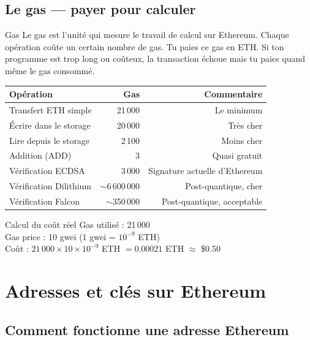 \documentclass[12pt, a4paper]{article}
\begin{document}
\subsection{Le gas --- payer pour calculer}

\begin{definition}{Gas}
Le gas est l'unité qui mesure le travail de calcul sur Ethereum. Chaque opération coûte
un certain nombre de gas. Tu paies ce gas en ETH. Si ton programme est trop long ou
coûteux, la transaction échoue mais tu paies quand même le gas consommé.
\end{definition}

\begin{center}
\renewcommand{\arraystretch}{1.4}
\begin{tabular}{lrr}
  \toprule
  \textbf{Opération} & \textbf{Gas} & \textbf{Commentaire} \\
  \midrule
  Transfert ETH simple & 21\,000 & Le minimum \\
  Écrire dans le storage & 20\,000 & Très cher \\
  Lire depuis le storage & 2\,100 & Moins cher \\
  Addition (ADD) & 3 & Quasi gratuit \\
  Vérification ECDSA & 3\,000 & Signature actuelle d'Ethereum \\
  Vérification Dilithium & $\sim$6\,600\,000 & Post-quantique, cher \\
  Vérification Falcon & $\sim$350\,000 & Post-quantique, acceptable \\
  \bottomrule
\end{tabular}
\end{center}

\begin{exemple}{Calcul du coût réel}
Gas utilisé : 21\,000\\
Gas price : 10 gwei (1 gwei = $10^{-9}$ ETH)\\
Coût : $21\,000 \times 10 \times 10^{-9}$ ETH $= 0.00021$ ETH $\approx$ \$0.50
\end{exemple}

\section{Adresses et clés sur Ethereum}

\subsection{Comment fonctionne une adresse Ethereum}
\end{document}

